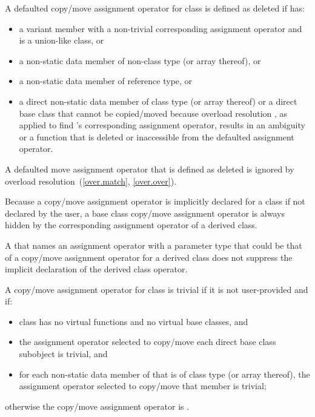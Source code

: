 \pnum
A defaulted copy/move assignment operator for
class  is defined as deleted if  has:
\begin{itemize}
\item a variant member with a non-trivial corresponding assignment operator and
   is a union-like class, or

\item a non-static data member of  non-class
  type (or array thereof), or

\item a non-static data member of reference type, or

\item a direct non-static data member of class type 
  (or array thereof) or a direct base class 
  that cannot be copied/moved because overload resolution
 , as applied to find 's corresponding
  assignment operator, results in an ambiguity or
  a function that is deleted or inaccessible from the
  defaulted assignment operator.
\end{itemize}

\begin{note}
A defaulted move assignment operator that is defined as deleted is ignored by
overload resolution~(\ref{over.match}, \ref{over.over}).
\end{note}

\pnum
{}%
%
Because a copy/move assignment operator is implicitly declared for a class
if not declared by the user,
a base class copy/move assignment operator is always hidden
by the corresponding assignment operator of a derived class.
\begin{note}
A  that names an assignment operator
with a parameter type that could be that of a
copy/move assignment operator for a
derived class does not suppress the implicit declaration of the derived class
operator.
\end{note}

\pnum
{}%
%
A copy/move assignment operator for class
is
trivial
if it is not user-provided and if:
\begin{itemize}
\item
class
has no virtual functions
and no virtual base classes, and

\item the assignment operator selected to copy/move each direct
base class subobject is trivial, and

\item
for each non-static data member of
that is of class type (or array thereof),
the assignment operator selected to copy/move that member is trivial;
\end{itemize}
%
otherwise the copy/move assignment operator is
.


